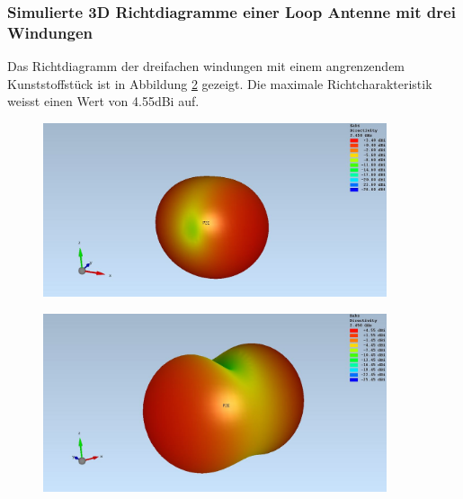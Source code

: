 \subsubsection{Simulierte 3D Richtdiagramme einer Loop Antenne mit drei Windungen}
Das Richtdiagramm der dreifachen windungen mit einem angrenzendem Kunststoffstück ist in Abbildung \ref{fig:sim_Loop_3Fach_1ABS_3D} gezeigt. Die maximale Richtcharakteristik weisst einen Wert von 4.55dBi auf.
\begin{figure}[h]
	\begin{center}
		\includegraphics[width=0.9\textwidth]{content/bilder/Evaluation/Loop/ohneABS/EM_Far_Field_Loop_Coil_ohneABS.JPG}
		\label{fig:sim_Loop_3Fach_freiraum_3D}
	\end{center}
\end{figure}
\begin{figure}
	\begin{center}
		\includegraphics[width=0.9\textwidth]{content/bilder/Evaluation/Loop/Mit1ABS/EM_Far_Filed_Loop_Coil_1ABS.JPG}
		\label{fig:sim_Loop_3Fach_1ABS_3D}
	\end{center}
\end{figure}

